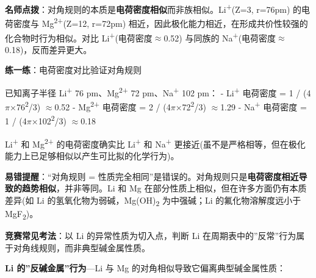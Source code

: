 \documentclass[a4paper,11pt]{ctexart}
\newcommand{\箭}{\ensuremath{\rightarrow}}
\newcommand{\左箭}{\ensuremath{\leftarrow}}
\newcommand{\上箭}{\ensuremath{\uparrow}}
\newcommand{\下箭}{\ensuremath{\downarrow}}
\newcommand{\衡}{\ensuremath{\rightleftharpoons}}
\newcommand{\双箭}{\ensuremath{\leftrightarrow}}
\newcommand{\约等于}{\ensuremath{\approx}}
\newcommand{\小于等于}{\ensuremath{\leq}}
\newcommand{\大于等于}{\ensuremath{\geq}}
\newcommand{\不等于}{\ensuremath{\neq}}
\newcommand{\西格马}{\ensuremath{\sigma}}
\newcommand{\派}{\ensuremath{\pi}}
\begin{document}
\textbf{名师点拨}：对角规则的本质是\textbf{电荷密度相似}而非族相似。Li\textsuperscript{+}(Z=3, r=76pm) 的电荷密度与 Mg\textsuperscript{2+}(Z=12, r=72pm) 相近，因此极化能力相近，在形成共价性较强的化合物时行为相似。对比 Li\textsuperscript{+}(电荷密度\约等于0.52) 与同族的 Na\textsuperscript{+}(电荷密度\约等于0.18)，反而差异更大。

\textbf{练一练}：电荷密度对比验证对角规则

已知离子半径 Li\textsuperscript{+} 76 pm、Mg\textsuperscript{2+} 72 pm、Na\textsuperscript{+} 102 pm：
- Li\textsuperscript{+} 电荷密度 = 1 / (4\派×76\textsuperscript{2}/3) \约等于 0.52
- Mg\textsuperscript{2+} 电荷密度 = 2 / (4\派×72\textsuperscript{2}/3) \约等于 1.29
- Na\textsuperscript{+} 电荷密度 = 1 / (4\派×102\textsuperscript{2}/3) \约等于 0.18

Li\textsuperscript{+} 和 Mg\textsuperscript{2+} 的电荷密度确实比 Li\textsuperscript{+} 和 Na\textsuperscript{+} 更接近(虽不是严格相等，但在极化能力上已足够相似以产生可比拟的化学行为)。

\textbf{易错提醒}：``对角规则 = 性质完全相同''是错误的。对角规则只是\textbf{电荷密度相近导致的趋势相似}，并非等同。Li 和 Mg 在部分性质上相似，但在许多方面仍有本质差异(如 Li 的氢氧化物为弱碱，Mg(OH)\textsubscript{2} 为中强碱；Li 的氟化物溶解度远小于 MgF\textsubscript{2})。

\textbf{竞赛常见考法}：以 Li 的异常性质为切入点，判断 Li 在周期表中的''反常''行为属于对角线规则，而非典型碱金属性质。

\textbf{Li 的''反碱金属''行为}---Li 与 Mg 的对角相似导致它偏离典型碱金属性质：
\end{document}
